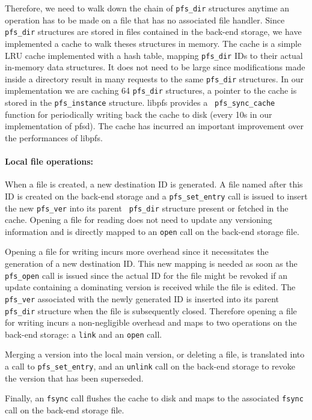 Therefore, we need to walk down the chain of {\tt pfs\_dir} structures
anytime an operation has to be made on a file that has no associated
file handler. Since {\tt pfs\_dir} structures are stored in files
contained in the back-end storage, we have implemented a cache to walk
theses structures in memory.  The cache is a simple LRU cache
implemented with a hash table, mapping {\tt pfs\_dir} IDs to their
actual in-memory data structures. It does not need to be large since
modifications made inside a directory result in many requests to the
same {\tt pfs\_dir} structures. In our implementation we are caching
64 {\tt pfs\_dir} structures, a pointer to the cache is stored in the
{\tt pfs\_instance} structure. libpfs provides a {\tt
  pfs\_sync\_cache} function for periodically writing back the cache
to disk (every 10s in our implementation of pfsd). The cache has
incurred an important improvement over the performances of libpfs.

\paragraph{Local file operations:}
When a file is created, a new destination ID is generated. A file named
after this ID is created on the back-end storage and a {\tt pfs\_set\_entry}
call is issued to insert the new {\tt pfs\_ver} into its parent {\tt
  pfs\_dir} structure present or fetched in the cache.  Opening a file
for reading does not need to update any versioning information and is
directly mapped to an {\tt open} call on the back-end storage file.

Opening a file for writing incurs more overhead since it necessitates
the generation of a new destination ID. This new mapping is needed as
soon as the {\tt pfs\_open} call is issued since the actual ID for the
file might be revoked if an update containing a dominating version is
received while the file is edited. The {\tt pfs\_ver} associated with
the newly generated ID is inserted into its parent {\tt pfs\_dir}
structure when the file is subsequently closed. Therefore opening a
file for writing incurs a non-negligible overhead and maps to two
operations on the back-end storage: a {\tt link} and an {\tt open}
call.

Merging a version into the local main version, or deleting a file, is
translated into a call to {\tt pfs\_set\_entry}, and an {\tt unlink}
call on the back-end storage to revoke the version that has been
superseded.

Finally, an {\tt fsync} call flushes the cache to disk and maps to the
associated {\tt fsync} call on the back-end storage file.

